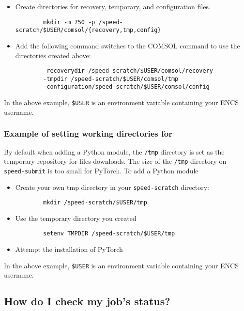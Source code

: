 \begin{itemize}
	\item Create directories for recovery, temporary, and configuration files. 
	\begin{verbatim}
		mkdir -m 750 -p /speed-scratch/$USER/comsol/{recovery,tmp,config}
	\end{verbatim}
	\item Add the following command switches to the COMSOL command to use the 
	directories created above:
	\begin{verbatim} 
		-recoverydir /speed-scratch/$USER/comsol/recovery 
		-tmpdir /speed-scratch/$USER/comsol/tmp
		-configuration/speed-scratch/$USER/comsol/config
	\end{verbatim}
\end{itemize} 
\noindent In the above example, \verb!$USER! is an environment variable containing your ENCS username.

\subsubsection{Example of setting working directories for }

By default when adding a Python module, the \texttt{/tmp} directory is set as the temporary repository for files downloads.
The size of the \texttt{/tmp} directory on \verb!speed-submit! is too small for PyTorch.
To add a Python module
\begin{itemize}
    \item Create your own tmp directory in your \verb!speed-scratch! directory:
	\begin{verbatim} 
  		mkdir /speed-scratch/$USER/tmp
	\end{verbatim}
	\item Use the temporary directory you created
	\begin{verbatim} 
  		setenv TMPDIR /speed-scratch/$USER/tmp
	\end{verbatim}
    \item Attempt the installation of PyTorch
\end{itemize}
\noindent In the above example, \verb!$USER! is an environment variable containing your ENCS username.

\subsection{How do I check my job's status?}

